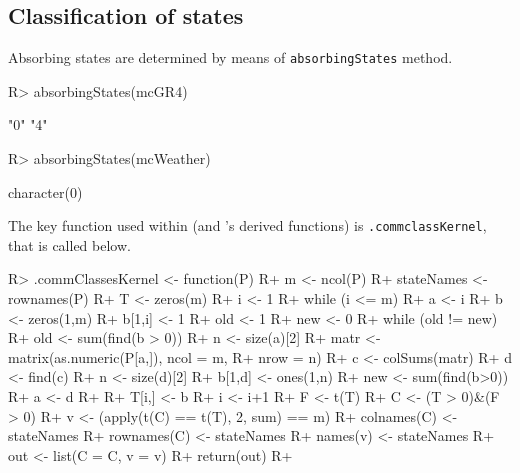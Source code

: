 \documentclass[
  nojss]{jss}
\begin{document}
\hypertarget{classification-of-states}{%
\subsection{Classification of states}\label{classification-of-states}}

Absorbing states are determined by means of \texttt{absorbingStates} method.

\begin{CodeChunk}

\begin{CodeInput}
R> absorbingStates(mcGR4)
\end{CodeInput}

\begin{CodeOutput}
[1] "0" "4"
\end{CodeOutput}

\begin{CodeInput}
R> absorbingStates(mcWeather)
\end{CodeInput}

\begin{CodeOutput}
character(0)
\end{CodeOutput}
\end{CodeChunk}

The key function used within \cite{renaldoMatlab} (and 's derived functions) is \texttt{.commclassKernel}, that is called below.

\begin{CodeChunk}

\begin{CodeInput}
R> .commClassesKernel <- function(P){
R+   m <- ncol(P)
R+  stateNames <- rownames(P)
R+  T <- zeros(m) 
R+  i <- 1
R+  while (i <= m) { 
R+      a <- i 
R+      b <- zeros(1,m)
R+      b[1,i] <- 1
R+      old <- 1
R+      new <- 0
R+      while (old != new) {
R+          old <- sum(find(b > 0))
R+          n <- size(a)[2]
R+          matr <- matrix(as.numeric(P[a,]), ncol = m, 
R+                      nrow = n)
R+          c <- colSums(matr)
R+          d <- find(c)
R+          n <- size(d)[2]
R+          b[1,d] <- ones(1,n)
R+          new <- sum(find(b>0))
R+          a <- d
R+      }
R+      T[i,] <- b
R+      i <- i+1 }
R+  F <- t(T)  
R+  C <- (T > 0)&(F > 0)
R+  v <- (apply(t(C) == t(T), 2, sum) == m)
R+  colnames(C) <- stateNames
R+  rownames(C) <- stateNames
R+  names(v) <- stateNames
R+  out <- list(C = C, v = v)
R+  return(out)
R+ }
\end{CodeInput}
\end{CodeChunk}
\end{document}

